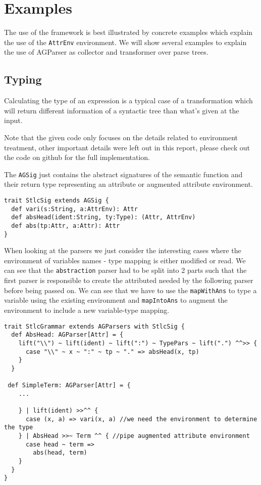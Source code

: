 \section{Examples}
The use of the framework is best illustrated by concrete examples which explain the use of the \verb/AttrEnv/ environment. We will show several examples to explain the use of AGParser as collector and transformer over parse trees.

\subsection{Typing}
Calculating the type of an expression is a typical case of a transformation which will return different information of a syntactic tree than what's given at the input.

Note that the given code only focuses on the details related to environment treatment, other important details were left out in this report, please check out the code on github for the full implementation.

The \verb/AGSig/ just contains the abstract signatures of the semantic function and their return type representing an attribute or augmented attribute environment.
\begin{lstlisting}
trait StlcSig extends AGSig {
  def vari(s:String, a:AttrEnv): Attr
  def absHead(ident:String, ty:Type): (Attr, AttrEnv)
  def abs(tp:Attr, a:Attr): Attr
}
\end{lstlisting}

When looking at the parsers we just consider the interesting cases where the environment of variables names - type mapping is either modified or read. We can see that the \verb/abstraction/ parser had to be split into 2 parts such that the first parser is responsible to create the attributed needed by the following parser before being passed on.
We can see that we have to use the \verb/mapWithAns/ to type a variable using the existing environment and \verb/mapIntoAns/ to augment the environment to include a new variable-type mapping.

\begin{lstlisting}
trait StlcGrammar extends AGParsers with StlcSig {
  def AbsHead: AGParser[Attr] = {
    lift("\\") ~ lift(ident) ~ lift(":") ~ TypePars ~ lift(".") ^^>> {
      case "\\" ~ x ~ ":" ~ tp ~ "." => absHead(x, tp)
    }
  }

 def SimpleTerm: AGParser[Attr] = {
    ...

    } | lift(ident) >>^^ {
      case (x, a) => vari(x, a) //we need the environment to determine the type
    } | AbsHead >>~ Term ^^ { //pipe augmented attribute environment
      case head ~ term =>
        abs(head, term)
    }
  }
}
\end{lstlisting}

